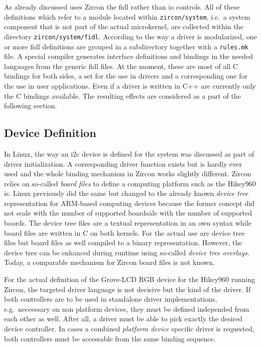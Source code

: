 As already discussed uses Zircon the \acf{fidl} rather than \ac{io} controls.
All of these definitions which refer to a module located within \texttt{zircon/system}, i.e.\ a system component that is not part of the actual microkernel, are collected within the directory \texttt{zircon/system/fidl}.
According to the way a driver is modularized, one or more \ac{fidl} definitions are grouped in a subdirectory together with a \texttt{rules.mk} file.
A special compiler generates interface definitions and bindings in the needed languages from the generic \ac{fidl} files.
At the moment, these are most of all C bindings for both sides, a set for the use in drivers and a corresponding one for the use in user applications.
Even if a driver is written in C++ are currently only the C bindings available.
The resulting effects are considered as a part of the following section.

\subsection{Device Definition}
In Linux, the way an \ac{i2c} device is defined for the system was discussed as part of driver initialization.
A corresponding driver function exists but is hardly ever used and the whole binding mechanism in Zircon works slightly different.
Zircon relies on so-called \textit{board files} to define a computing platform such as the Hikey960 is.
Linux previously did the same but changed to the already known \textit{device tree} representation for ARM-based computing devices because the former concept did not scale with the number of supported boards\.
ale with the number of supported boards.
The device tree files are a textual representation in an own syntax while board files are written in C on both kernels.
For the actual use are device tree files but board files as well compiled to a binary representation.
However, the device tree can be enhanced during runtime using so-called \textit{device tree overlays}.
Today, a comparable mechanism for Zircon board files is not known.

For the actual definition of the Grove-LCD RGB device for the Hikey960 running Zircon, the targeted driver language is not decisive but the kind of the driver.
If both controllers are to be used in standalone driver implementations, e.g.\ neccessary on non platform devices, they must be defined independed from each other as well.
After all, a driver must be able to pick exactly the desired device controller.
In cases a combined \textit{platform device} specific driver is requested, both controllers must be accessable from the same binding sequence.

